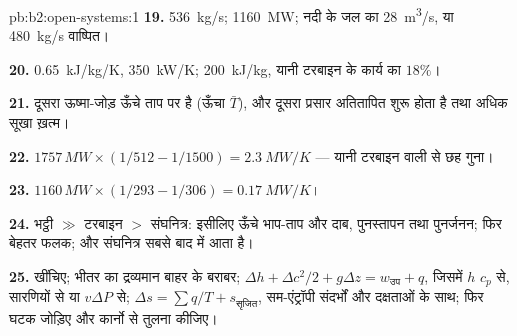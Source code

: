 \begin{solution}{pb:b2:open-systems:1}
\textbf{19.} \qty{536}{kg/s}; \qty{1160}{MW}; नदी के जल का \qty{28}{m^3/s},
या \qty{480}{kg/s} वाष्पित।

\textbf{20.} \qty{0.65}{kJ/kg/K}, \qty{350}{kW/K}; \qty{200}{kJ/kg}, यानी टरबाइन के
कार्य का $18\%$।

\textbf{21.} दूसरा ऊष्मा-जोड़ ऊँचे ताप पर है (ऊँचा
$\bar T$), और दूसरा प्रसार अतितापित शुरू होता है तथा अधिक सूखा ख़त्म।

\textbf{22.} $1757\,\unit{MW} \times (1/512 - 1/1500) = \qty{2.3}{MW/K}$ --- यानी टरबाइन
वाली से छह गुना।

\textbf{23.} $1160\,\unit{MW} \times (1/293 - 1/306) = \qty{0.17}{MW/K}$।

\textbf{24.} भट्ठी $\gg$ टरबाइन $>$ संघनित्र: इसीलिए ऊँचे भाप-ताप
और दाब, पुनस्तापन तथा पुनर्जनन; फिर बेहतर
फलक; और संघनित्र सबसे बाद में आता है।

\textbf{25.}  खींचिए; भीतर का द्रव्यमान बाहर के बराबर; $\Delta h +
\Delta c^2/2 + g\Delta z = w_{\text{उप}} + q$, जिसमें $h$ $c_p$ से, सारणियों से या
$v\Delta P$ से; $\Delta s = \sum q/T + s_{\text{सृजित}}$, सम-एंट्रॉपी संदर्भों और
दक्षताओं के साथ; फिर घटक जोड़िए और कार्नो से तुलना कीजिए।
\end{solution}
